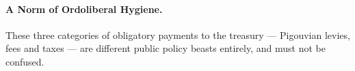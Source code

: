\paragraph[Ordoliberal Hygiene]{A Norm of Ordoliberal Hygiene.}
	\label{sec:ordoliberal-hygiene}
These three categories of obligatory payments to the treasury --- Pigouvian levies, fees and taxes --- are different public policy beasts entirely, and must not be confused.

%
%






